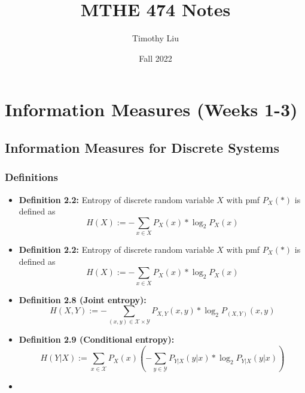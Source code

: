 \documentclass{article}
\begin{document}
\title{MTHE 474 Notes}
\author{Timothy Liu}
\date{Fall 2022}
\maketitle
\newpage

\tableofcontents

\newpage
\section{Information Measures (Weeks 1-3)}
\subsection{Information Measures for Discrete Systems}
\subsubsection{Definitions}
\begin{flushleft}
    \begin{itemize}
   
    \item \textbf{Definition 2.2:} Entropy of discrete random variable \(X\) with pmf \(P_X(*)\) is defined as \[H(X):=-\sum_{x \in X}{P_X(x)*\log_{2}{P_X(x)}}\]

    \item \textbf{Definition 2.2:} Entropy of discrete random variable \(X\) with pmf \(P_X(*)\) is defined as \[H(X):=-\sum_{x \in X}{P_X(x)*\log_{2}{P_X(x)}}\]
    \item \textbf{Definition 2.8 (Joint entropy):} \[H(X,Y) := - \sum_{(x,y) \in \mathcal{X} \times \mathcal{Y}}{P_{X,Y}{(x,y)}*\log_{2}{P_{({X,Y})}{(x,y)}}}\]
    \item \textbf{Definition 2.9 (Conditional entropy):} \[H(Y|X) := \sum_{x \in \mathcal{X}} P_X(x) (-\sum_{y \in \mathcal{Y}} P_{Y|X}{(y|x)} * \log_{2}{P_{Y|X}{(y|x)}})\]
    \item 
    \end{itemize}
\end{flushleft}
\end{document}
